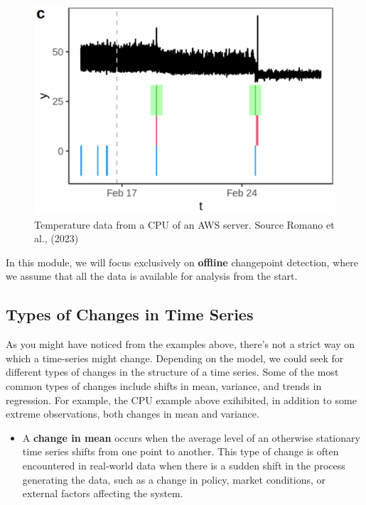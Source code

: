 \documentclass[
  letterpaper,
  DIV=11,
  numbers=noendperiod]{scrreprt}
\providecommand{\tightlist}{%
  \setlength{\itemsep}{0pt}\setlength{\parskip}{0pt}}\usepackage{longtable,booktabs,array}
\begin{document}
\begin{enumerate}
  \begin{figure}[H]

  {\centering \includegraphics{source_imgs/CPU-monitoring.png}

  }

  \caption{Temperature data from a CPU of an AWS server. Source Romano
  et al., (2023)}

  \end{figure}%
\end{enumerate}

In this module, we will focus exclusively on \textbf{offline}
changepoint detection, where we assume that all the data is available
for analysis from the start.

\subsection{Types of Changes in Time
Series}\label{types-of-changes-in-time-series}

As you might have noticed from the examples above, there's not a strict
way on which a time-series might change. Depending on the model, we
could seek for different types of changes in the structure of a time
series. Some of the most common types of changes include shifts in mean,
variance, and trends in regression. For example, the CPU example above
exihibited, in addition to some extreme observations, both changes in
mean and variance.

\begin{itemize}
\tightlist
\item
  A \textbf{change in mean} occurs when the average level of an
  otherwise stationary time series shifts from one point to another.
  This type of change is often encountered in real-world data when there
  is a sudden shift in the process generating the data, such as a change
  in policy, market conditions, or external factors affecting the
  system.
\end{itemize}
\end{document}
